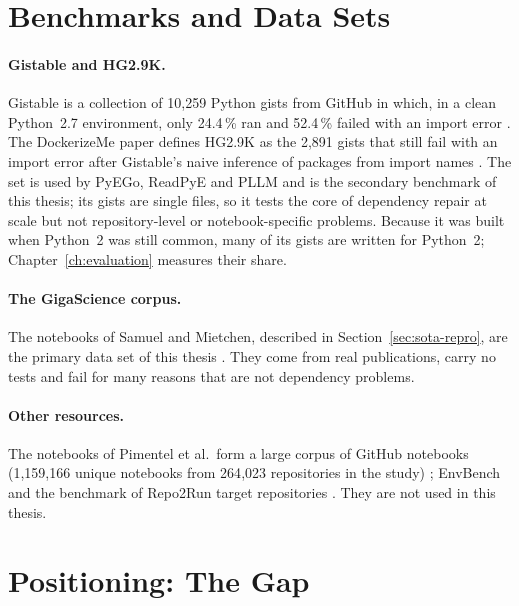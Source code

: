 \section{Benchmarks and Data Sets}\label{sec:sota-bench}

\paragraph{Gistable and HG2.9K.}
Gistable is a collection of 10{,}259 Python gists from GitHub in which, in a clean Python~2.7 environment, only 24.4\,\% ran and 52.4\,\% failed with an import error \cite{horton2018gistable}. The DockerizeMe paper defines HG2.9K as the 2{,}891 gists that still fail with an import error after Gistable's naive inference of packages from import names \cite{horton2019dockerizeme}. The set is used by PyEGo, ReadPyE and PLLM and is the secondary benchmark of this thesis; its gists are single files, so it tests the core of dependency repair at scale but not repository-level or notebook-specific problems. Because it was built when Python~2 was still common, many of its gists are written for Python~2; Chapter~\ref{ch:evaluation} measures their share.%

\paragraph{The GigaScience corpus.}
The notebooks of Samuel and Mietchen, described in Section~\ref{sec:sota-repro}, are the primary data set of this thesis \cite{samuel2024computational}. They come from real publications, carry no tests and fail for many reasons that are not dependency problems.

\paragraph{Other resources.}
The notebooks of Pimentel et al.\ form a large corpus of GitHub notebooks (1{,}159{,}166 unique notebooks from 264{,}023 repositories in the study) \cite{pimentel2019large}; EnvBench and the benchmark of Repo2Run target repositories \cite{eliseeva2025envbench,hu2025repo2run}. They are not used in this thesis.

\section{Positioning: The Gap}\label{sec:sota-gap}

